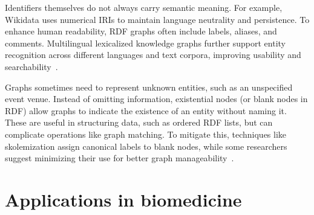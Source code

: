 Identifiers themselves do not always carry semantic meaning. For example, Wikidata uses numerical IRIs to maintain language neutrality and persistence. To enhance human readability, RDF graphs often include labels, aliases, and comments. Multilingual lexicalized knowledge graphs further support entity recognition across different languages and text corpora, improving usability and searchability~\cite{DeMelo2015Lexvo.org}\cite{MartinezRodriguez2020InformationExtractionMeetsSemanticWeb}.

Graphs sometimes need to represent unknown entities, such as an unspecified event venue. Instead of omitting information, existential nodes (or blank nodes in RDF) allow graphs to indicate the existence of an entity without naming it. These are useful in structuring data, such as ordered RDF lists, but can complicate operations like graph matching. To mitigate this, techniques like skolemization assign canonical labels to blank nodes, while some researchers suggest minimizing their use for better graph manageability~\cite{Cyganiak2014rdf}\cite{Hogan2017CanonicalFormsIsomorphicEquivalentRDFGraphs}\cite{Longley2019RDFDatasetNormalization}.






\section{Applications in biomedicine}\label{kgs:biomed}
